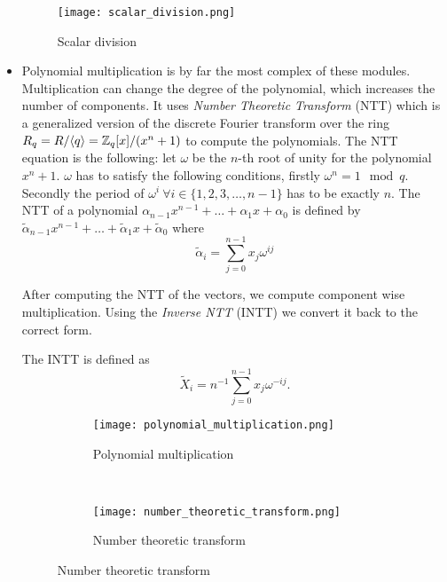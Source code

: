 \begin{itemize}
        \begin{figure}[H]
            \centering
            \texttt{[image: scalar\_division.png]}
            \caption{Scalar division \citep{FPGA_Post_Quantum_Primitives}}
            \label{fig:scalar_div}
        \end{figure}


    \item
        Polynomial multiplication is by far the most complex of these modules.
        Multiplication can change the degree of the polynomial, which increases
        the number of components. It uses \textit{Number Theoretic
        Transform} (NTT) which is a generalized version of the discrete Fourier
        transform over the ring $R_q = R / \langle q \rangle = \mathbb{Z}_q [x] / (x^n
        + 1)$ to compute the polynomials. The NTT equation is the following:
        let $\omega$ be the $n$-th root of unity for the polynomial $x^n + 1$.
        $\omega$ has to satisfy the following conditions, firstly $\omega^n = 1
        \mod q$. Secondly the period of $\omega^i \ \forall i \in \{1, 2, 3,
        \ldots, n - 1\}$ has to be exactly $n$. The NTT of a polynomial
        $\alpha_{n-1}x^{n-1} + \ldots + \alpha_1 x +
        \alpha_0$ is defined by $\tilde\alpha_{n-1}x^{n-1} +
        \ldots + \tilde\alpha_1 x + \tilde\alpha_0$ where
        \[ \tilde \alpha_i = \sum^{n-1}_{j=0} x_j \omega^{ij} \]

        After computing the NTT of the vectors, we compute component wise
        multiplication. Using the \textit{Inverse NTT} (INTT) we convert it
        back to the correct form.

        The INTT is defined as \[\tilde X_i =
            n^{-1} \sum^{n-1}_{j=0} x_j \omega^{-ij}.\]


        \begin{figure}[H]
            \centering
            \begin{subfigure}[b]{0.4\textwidth}
                \centering
                \texttt{[image: polynomial\_multiplication.png]}
                \caption{Polynomial multiplication
                    \citep{FPGA_Post_Quantum_Primitives}}
                \label{fig:poly_mul}
            \end{subfigure}
            ~
            \begin{subfigure}[b]{0.4\textwidth}
                \centering
                \texttt{[image: number\_theoretic\_transform.png]}
                \caption{Number theoretic transform
                \citep{FPGA_Post_Quantum_Primitives}}
                \label{fig:ntt}
            \end{subfigure}
        \end{figure}

\end{itemize}


